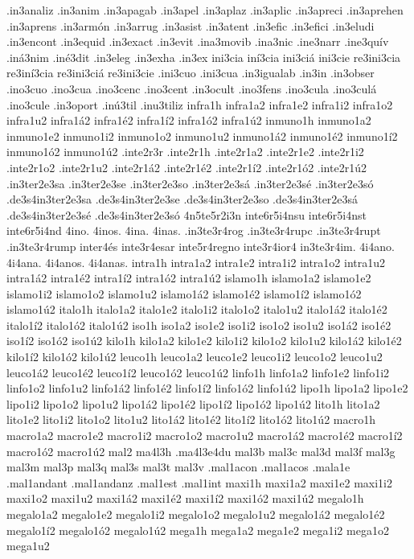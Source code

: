 {.in3analiz
.in3anim
.in3apagab
.in3apel
.in3aplaz
.in3aplic
.in3apreci
.in3aprehen
.in3aprens
.in3armón
.in3arrug
.in3asist
.in3atent
.in3efic
.in3efici
.in3eludi
.in3encont
.in3equid
.in3exact
.in3evit
.ina3movib
.ina3nic
.ine3narr
.ine3quív
.iná3nim
.iné3dit
.in3eleg
.in3exha
.in3ex
ini3cia
iní3cia
ini3ciá
ini3cie
re3ini3cia
re3iní3cia
re3ini3ciá
re3ini3cie
.ini3cuo
.ini3cua
.in3igualab
.in3in
.in3obser
.ino3cuo
.ino3cua
.ino3cenc
.ino3cent
.in3ocult
.ino3fens
.ino3cula
.ino3culá
.ino3cule
.in3oport
.inú3til
.inu3tiliz
infra1h
infra1a2 infra1e2 infra1i2 infra1o2 infra1u2
infra1á2 infra1é2 infra1í2 infra1ó2 infra1ú2
inmuno1h
inmuno1a2 inmuno1e2 inmuno1i2 inmuno1o2 inmuno1u2
inmuno1á2 inmuno1é2 inmuno1í2 inmuno1ó2 inmuno1ú2
.inte2r3r
.inte2r1h
.inte2r1a2 .inte2r1e2 .inte2r1i2 .inte2r1o2 .inte2r1u2
.inte2r1á2 .inte2r1é2 .inte2r1í2 .inte2r1ó2 .inte2r1ú2
.in3ter2e3sa
.in3ter2e3se
.in3ter2e3so
.in3ter2e3sá
.in3ter2e3sé
.in3ter2e3só
.de3s4in3ter2e3sa
.de3s4in3ter2e3se
.de3s4in3ter2e3so
.de3s4in3ter2e3sá
.de3s4in3ter2e3sé
.de3s4in3ter2e3só
4n5te5r2i3n
inte6r5i4nsu
inte6r5i4nst
inte6r5i4nd
4ino.
4inos.
4ina.
4inas.
.in3te3r4rog
.in3te3r4rupc
.in3te3r4rupt
.in3te3r4rump
inter4és
inte3r4esar
inte5r4regno
inte3r4ior4
in3te3r4im.
4i4ano.
4i4ana.
4i4anos.
4i4anas.
intra1h
intra1a2 intra1e2 intra1i2 intra1o2 intra1u2
intra1á2 intra1é2 intra1í2 intra1ó2 intra1ú2
islamo1h
islamo1a2 islamo1e2 islamo1i2 islamo1o2 islamo1u2
islamo1á2 islamo1é2 islamo1í2 islamo1ó2 islamo1ú2
italo1h
italo1a2 italo1e2 italo1i2 italo1o2 italo1u2
italo1á2 italo1é2 italo1í2 italo1ó2 italo1ú2
iso1h
iso1a2 iso1e2 iso1i2 iso1o2 iso1u2
iso1á2 iso1é2 iso1í2 iso1ó2 iso1ú2
kilo1h
kilo1a2 kilo1e2 kilo1i2 kilo1o2 kilo1u2
kilo1á2 kilo1é2 kilo1í2 kilo1ó2 kilo1ú2
leuco1h
leuco1a2 leuco1e2 leuco1i2 leuco1o2 leuco1u2
leuco1á2 leuco1é2 leuco1í2 leuco1ó2 leuco1ú2
linfo1h
linfo1a2 linfo1e2 linfo1i2 linfo1o2 linfo1u2
linfo1á2 linfo1é2 linfo1í2 linfo1ó2 linfo1ú2
lipo1h
lipo1a2 lipo1e2 lipo1i2 lipo1o2 lipo1u2
lipo1á2 lipo1é2 lipo1í2 lipo1ó2 lipo1ú2
lito1h
lito1a2 lito1e2 lito1i2 lito1o2 lito1u2
lito1á2 lito1é2 lito1í2 lito1ó2 lito1ú2
macro1h
macro1a2 macro1e2 macro1i2 macro1o2 macro1u2
macro1á2 macro1é2 macro1í2 macro1ó2 macro1ú2
mal2
ma4l3h
.ma4l3e4du
mal3b
mal3c
mal3d
mal3f
mal3g
mal3m
mal3p
mal3q
mal3s
mal3t
mal3v
.mal1acon
.mal1acos
.mala1e
.mal1andant
.mal1andanz
.mal1est
.mal1int
maxi1h
maxi1a2 maxi1e2 maxi1i2 maxi1o2 maxi1u2
maxi1á2 maxi1é2 maxi1í2 maxi1ó2 maxi1ú2
megalo1h
megalo1a2 megalo1e2 megalo1i2 megalo1o2 megalo1u2
megalo1á2 megalo1é2 megalo1í2 megalo1ó2 megalo1ú2
mega1h
mega1a2 mega1e2 mega1i2 mega1o2 mega1u2
}
